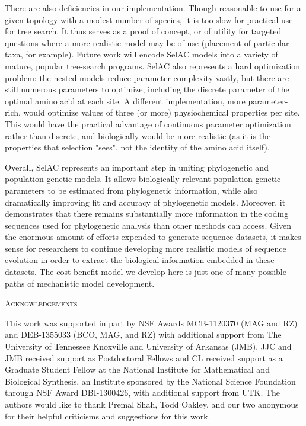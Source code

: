 \documentclass[12pt,letterpaper]{article}
\renewcommand{\section}[1]{%
\bigskip
\begin{center}
\begin{Large}
\normalfont\scshape #1
\medskip
\end{Large}
\end{center}}
\newcommand{\selac}{SelAC\xspace}
\begin{document}
There are also deficiencies in our implementation.
Though reasonable to use for a given topology with a modest number of species, it is too slow for practical use for tree search.
It thus serves as a proof of concept, or of utility for targeted questions where a more realistic model may be of use (placement of particular taxa, for example).
Future work will encode \selac models into a variety of mature, popular tree-search programs.
\selac also represents a hard optimization problem: the nested models reduce parameter complexity vastly, but there are still numerous parameters to optimize, including the discrete parameter of the optimal amino acid at each site.
A different implementation, more parameter-rich, would optimize values of three (or more) physiochemical properties per site.
This would have the practical advantage of continuous parameter optimization rather than discrete, and biologically would be more realistic (as it is the properties that selection "sees", not the identity of the amino acid itself).

Overall, \selac represents an important step in uniting phylogenetic and population genetic models.
It allows biologically relevant population genetic parameters to be estimated from phylogenetic information, while also dramatically improving fit and accuracy of phylogenetic models.
Moreover, it demonstrates that there remains substantially more information in the coding sequences used for phylogenetic analysis than other methods can access.
Given the enormous amount of efforts expended to generate sequence datasets, it makes sense for researchers to continue developing more realistic models of sequence evolution in order to extract the biological information embedded in these datasets.
The cost-benefit model we develop here is just one of many possible paths of mechanistic model development.



\section{Acknowledgements}
This work was supported in part by NSF Awards MCB-1120370 (MAG and RZ) and DEB-1355033 (BCO, MAG, and RZ) with additional support from The University of Tennessee Knoxville and University of Arkansas (JMB).
JJC and JMB received support as Postdoctoral Fellows and CL received support as a Graduate Student Fellow at the National Institute for Mathematical and Biological Synthesis, an Institute sponsored by the National Science Foundation through NSF Award DBI-1300426, with additional support from UTK.
The authors would like to thank Premal Shah, Todd Oakley, and our two anonymous  for their helpful criticisms and suggestions for this work.
\clearpage
\end{document}

